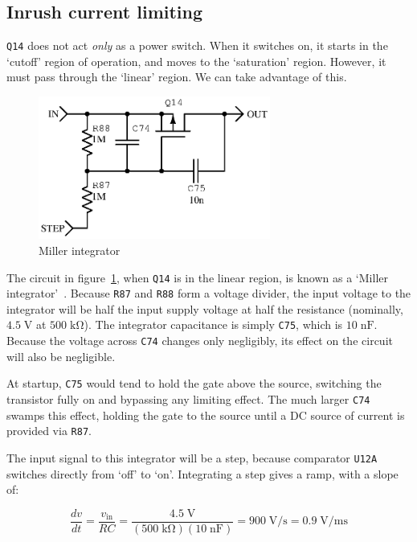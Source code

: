 \documentclass[article,oneside]{memoir}
\newcommand{\refdes}[1]{\texttt{#1}}
\newcommand{\mr}[1]{\ensuremath{\mathrm{#1}}}
\begin{document}
\begin{multicols}{2}
\subsection{Inrush current limiting}

\refdes{Q14} does not act \emph{only} as a power switch. When it switches on,
it starts in the `cutoff' region of operation, and moves to the `saturation'
region. However, it must pass through the `linear' region. We can take
advantage of this.

\begin{figure}[H]
\centering
\includegraphics[width=3in]{millerint}
\caption{Miller integrator}
\label{fig:miller}
\end{figure}

The circuit in figure~\ref{fig:miller}, when \refdes{Q14} is in the linear
region, is known as a `Miller integrator'~\cite[pg. 283]{tranckts-sawtooth}.
Because \texttt{R87} and \texttt{R88} form a voltage divider, the input
voltage to the integrator will be half the input supply voltage at half
the resistance (nominally, $4.5\;\mr{V}$ at $500\;\mr{k\Omega}$). The
integrator capacitance is simply \texttt{C75}, which is $10\;\mr{nF}$.
Because the voltage across \texttt{C74} changes only negligibly, its effect
on the circuit will also be negligible.

At startup, \refdes{C75} would tend to hold the gate above the source,
switching the transistor fully on and bypassing any limiting effect. The
much larger \refdes{C74} swamps this effect, holding the gate to the
source until a DC source of current is provided via \refdes{R87}.

The input signal to this integrator will be a step, because comparator
\texttt{U12A} switches directly from `off' to `on'. Integrating a step gives
a ramp, with a slope of:

\begin{equation*}
    \frac{dv}{dt} = \frac{v_\mr{in}}{RC} = \frac{4.5\;\mr{V}}{(500\;\mr{k\Omega})(10\;\mr{nF})}
    = 900\;\mr{V/s} = 0.9\;\mr{V/ms}
\end{equation*}


\end{multicols}
\end{document}
